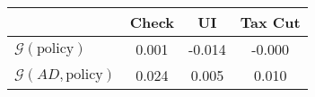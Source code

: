 \begin{tabular}{@{}lccc@{}} 
\toprule 
                          & Check      & UI    & Tax Cut    \\  \midrule 
$\mathcal{G}(\text{policy})$ & 0.001  & -0.014  & -0.000     \\ 
$\mathcal{G}(AD,\text{policy})$ & 0.024  & 0.005  & 0.010     \\ 
\end{tabular}  
